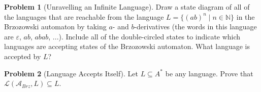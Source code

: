 \documentclass[11pt]{article}
\theoremstyle{theorem} %
\theoremstyle{definition} %
\newtheorem{problem}                    {{\color{BurntOrange}Problem}}
\theoremstyle{remark} %
\begin{document}
\begin{problem}
    [Unravelling an Infinite Language]
    Draw a state diagram of all of the languages that are reachable from the language \(L = \{(ab)^n \mid n \in \mathbb N\}\) in the Brzozowski automaton by taking \(a\)- and \(b\)-derivatives (the words in this language are \(\varepsilon\), \(ab\), \(abab\), ...). 
    Include all of the double-circled states to indicate which languages are accepting states of the Brzozowski automaton.
    What language is accepted by \(L\)?
\end{problem}

\begin{problem}
    [Language Accepts Itself]
    Let \(L \subseteq A^*\) be any language. 
    Prove that \(\mathcal L(\mathcal A_{Brz}, L) \subseteq L\).
\end{problem}
\end{document}
